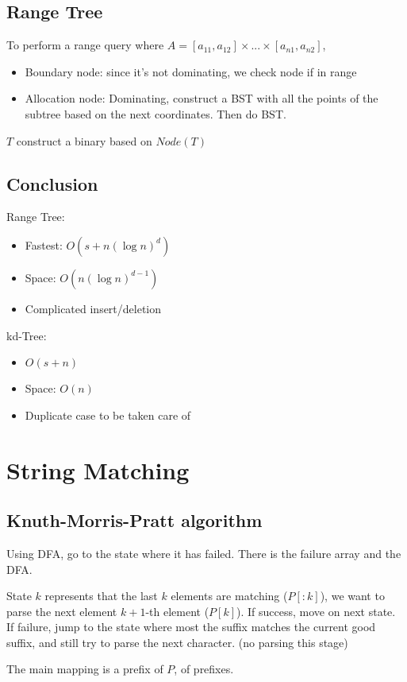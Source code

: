 \documentclass{article}
\theoremstyle{plain}
\theoremstyle{definition}
\begin{document}
\subsection{Range Tree}
To perform a range query where $A = [a_{11}, a_{12}] \times ... \times [a_{n1}, a_{n2}]$,
\begin{itemize}
    \item Boundary node: since it's not dominating, we check node if in range
    \item Allocation node: Dominating, construct a BST with all the points of the subtree
        based on the next coordinates. Then do BST.
\end{itemize}
$T$ construct a binary based on $Node(T)$

\subsection{Conclusion}
Range Tree:
\begin{itemize}
    \item Fastest: $O(s + n(\log n)^d)$
    \item Space: $O(n(\log n)^{d-1})$
    \item Complicated insert/deletion
\end{itemize}

kd-Tree:
\begin{itemize}
    \item $O(s + n)$
    \item Space: $O(n)$
    \item Duplicate case to be taken care of
\end{itemize}

\section{String Matching}
\subsection{Knuth-Morris-Pratt algorithm}
Using DFA, go to the state where it has failed. There is the failure array and the DFA.

State $k$ represents that the last $k$ elements are matching ($P[:k]$),
we want to parse the next element $k+1$-th element ($P[k]$). If success, move on next
state. If failure, jump to the state where most the suffix matches the current good suffix,
and still try to parse the next character. (no parsing this stage)

The main mapping is a prefix of $P$, of prefixes.
\end{document}

